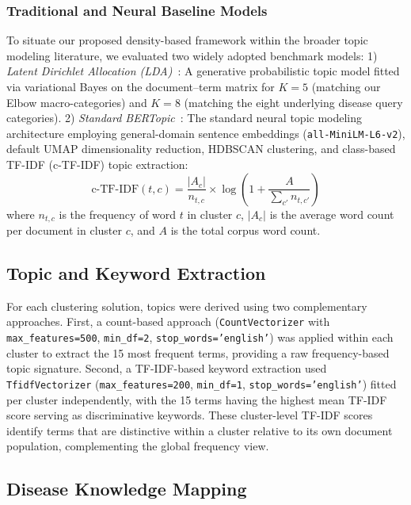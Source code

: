 \documentclass[a4paper,10pt,conference]{IEEEtran}
\begin{document}
\subsubsection{Traditional and Neural Baseline Models}

To situate our proposed density-based framework within the broader topic modeling literature, we evaluated two widely adopted benchmark models:
1) \textit{Latent Dirichlet Allocation (LDA)}~\cite{ref35}: A generative probabilistic topic model fitted via variational Bayes on the document--term matrix for $K=5$ (matching our Elbow macro-categories) and $K=8$ (matching the eight underlying disease query categories).
2) \textit{Standard BERTopic}~\cite{ref17}: The standard neural topic modeling architecture employing general-domain sentence embeddings (\texttt{all-MiniLM-L6-v2}), default UMAP dimensionality reduction, HDBSCAN clustering, and class-based TF-IDF (c-TF-IDF) topic extraction:
\begin{equation}
\text{c-TF-IDF}(t, c) = \frac{|A_c|}{n_{t,c}} \times \log \left( 1 + \frac{A}{\sum_{c'} n_{t,c'}} \right)
\end{equation}
where $n_{t,c}$ is the frequency of word $t$ in cluster $c$, $|A_c|$ is the average word count per document in cluster $c$, and $A$ is the total corpus word count.

\subsection{Topic and Keyword Extraction}

For each clustering solution, topics were derived using two complementary approaches. First, a count-based approach (\texttt{CountVectorizer} with \texttt{max\_features=500}, \texttt{min\_df=2}, \texttt{stop\_words='english'}) was applied within each cluster to extract the 15 most frequent terms, providing a raw frequency-based topic signature. Second, a TF-IDF-based keyword extraction used \texttt{TfidfVectorizer} (\texttt{max\_features=200}, \texttt{min\_df=1}, \texttt{stop\_words='english'}) fitted per cluster independently, with the 15 terms having the highest mean TF-IDF score serving as discriminative keywords. These cluster-level TF-IDF scores identify terms that are distinctive within a cluster relative to its own document population, complementing the global frequency view.

\subsection{Disease Knowledge Mapping}
\end{document}
